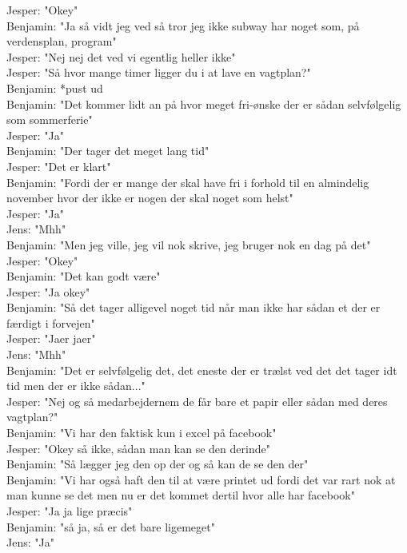 Jesper: "Okey"\\
Benjamin: "Ja så vidt jeg ved så tror jeg ikke subway har noget som, på verdensplan, program"\\
Jesper: "Nej nej det ved vi egentlig heller ikke"\\
Jesper: "Så hvor mange timer ligger du i at lave en vagtplan?"\\
Benjamin: *pust ud\\
Benjamin: "Det kommer lidt an på hvor meget fri-ønske der er sådan selvfølgelig som sommerferie"\\
Jesper: "Ja"\\
Benjamin: "Der tager det meget lang tid"\\
Jesper: "Det er klart"\\
Benjamin: "Fordi der er mange der skal have fri i forhold til en almindelig november hvor der ikke er nogen der skal noget som helst"\\
Jesper: "Ja"\\
Jens: "Mhh"\\
Benjamin: "Men jeg ville, jeg vil nok skrive, jeg bruger nok en dag på det"\\
Jesper: "Okey"\\
Benjamin: "Det kan godt være"\\
Jesper: "Ja okey"\\
Benjamin: "Så det tager alligevel noget tid når man ikke har sådan et der er færdigt i forvejen"\\
Jesper: "Jaer jaer"\\
Jens: "Mhh"\\
Benjamin: "Det er selvfølgelig det, det eneste der er trælst ved det det tager idt tid men der er ikke sådan..."\\
Jesper: "Nej og så medarbejdernem de får bare et papir eller sådan med deres vagtplan?"\\
Benjamin: "Vi har den faktisk kun i excel på facebook"\\
Jesper: "Okey så ikke, sådan man kan se den derinde"\\
Benjamin: "Så lægger jeg den op der og så kan de se den der"\\
Benjamin: "Vi har også haft den til at være printet ud fordi det var rart nok at man kunne se det men nu er det kommet dertil hvor alle har facebook"\\
Jesper: "Ja ja lige præcis"\\
Benjamin: "så ja, så er det bare ligemeget"\\
Jens: "Ja"\\
